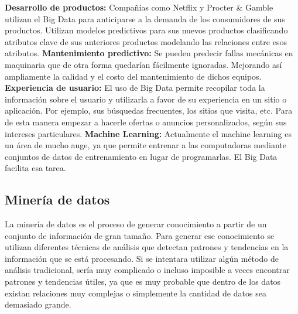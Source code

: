 \begin{UClist}
	\UCli \textbf{Desarrollo de productos:} Compañías como Netflix y Procter \& Gamble utilizan el Big Data para anticiparse a la demanda de los consumidores de sus productos. Utilizan modelos predictivos para sus nuevos productos clasificando atributos clave de sus anteriores productos modelando las relaciones entre esos atributos.
	\UCli \textbf{Mantenimiento predictivo:} Se pueden predecir fallas mecánicas en maquinaria que de otra forma quedarían fácilmente ignoradas. Mejorando así ampliamente la calidad y el costo del mantenimiento de dichos equipos.
	\UCli \textbf{Experiencia de usuario:} El uso de Big Data permite recopilar toda la información sobre el usuario y utilizarla a favor de su experiencia en un sitio o aplicación. Por ejemplo, sus búsquedas frecuentes, los sitios que visita, etc. Para de esta manera empezar a hacerle ofertas o anuncios personalizados, según sus intereses particulares.
	\UCli \textbf{Machine Learning:} Actualmente el machine learning es un área de mucho auge, ya que permite entrenar a las computadoras mediante conjuntos de datos de entrenamiento en lugar de programarlas. El Big Data facilita esa tarea.
\end{UClist}

\subsection{Minería de datos}
La minería de datos es el proceso de generar conocimiento a partir de un conjunto de información de gran tamaño. Para generar ese conocimiento se utilizan diferentes técnicas de análisis que detectan patrones y tendencias en la información que se está procesando. Si se intentara utilizar algún método de análisis tradicional, sería muy complicado o incluso imposible a veces encontrar patrones y tendencias útiles, ya que es muy probable que dentro de los datos existan relaciones muy complejas o simplemente la cantidad de datos sea demasiado grande.\\

